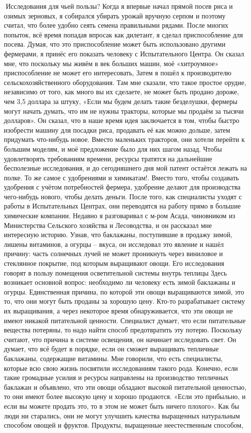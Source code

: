 \documentclass[a4paper]{book}
\begin{document}
Исследования для чьей пользы?
Когда я впервые начал прямой посев риса и озимых зерновых, я собирался убирать
урожай вручную серпом и поэтому считал, что более удобно сеять семена правильными
рядами. После многих попыток, всё время попадая впросак как дилетант, я сделал
приспособление для посева. Думая, что это приспособление может быть использовано
другими фермерами, я принёс его показать человеку с Испытательного Центра. Он сказал
мне, что поскольку мы живём в век больших машин, моё «хитроумное» приспособление не
может его интересовать,
Затем я пошёл к производителю сельскохозяйственного оборудования. Там мне сказали,
что такое простое орудие, независимо от того, как много вы их сделаете, не может быть
продано дороже, чем 3,5 доллара за штуку, «Если мы будем делать такие безделушки,
фермеры могут начать думать, что им не нужны тракторы, которые мы продаём за тысячи
долларов». Он сказал, что в наше время идея заключается в том, чтобы быстро изобрести
машину для посадки риса, продавать её как можно дольше, затем придумать что-нибудь
новое. Вместо маленьких тракторов, они хотели перейти к большим моделям, и моё
предложение было для них шагом назад. Чтобы удовлетворять требованиям времени,
ресурсы тратятся на дальнейшие бесполезные исследования, и до сегодняшнего дня мой
патент остаётся лежать на полке.
То же самое с удобрениями и химикатам!. Вместо того, чтобы создавать удобрения с
учётом потребностей фермера, удобрение делают для производства чего-нибудь нового,
чтобы делать деньги. После того, как специалисты уходят с работы в Испытательных
Центрах, они переводятся на работу прямо в большие химические компании. Недавно я
разговаривал с м-ром Асада, чиновником из Министерства Сельского хозяйства и
Лесоводства, и он рассказал мне интересную историю. Узнав, что баклажаны, поступившие
в продажу зимой, лишены витаминов, а огурцы – вкуса, он исследовал это явление и нашёл
причину: часть солнечных лучей не может проникнуть через виниловое и стеклянное
покрытие, под которым выращивают овощи. Его исследования говорят в пользу помещения
осветительной системы внутрь теплицы
Здесь возникает основной вопрос: необходимо ли человеку есть зимой баклажаны и
огурцы. Единственная причина, по которой эти овощи выращиваются зимой, это то, что они
могут быть проданы за хорошую цену. Кто-то разрабатывает систему их выращивания, а через
некоторое время обнаруживается, что эти овощи не имеют никакой питательной ценности.
Специалист думает, что если питательные вещества потеряны, то надо найти способ
предотвратить эту потерю. Поскольку считают, что причина в системе освещения, он
начинает исследовать свет. Он думает, что всё будет в порядке, если он сможет выращивать
тепличные баклажаны, содержащие витамины. Мне говорили, что есть специалисты,
которые всю свою жизнь посвятили исследованиям такого рода.
Конечно, если такие громадные усилия и ресурсы направлены на производство
тепличных баклажан и объявлено, что эти овощи обладают высокой питательной ценностью,
то они имеют более высокую цену и хорошо продаются. «Если это прибыльно, и если вы
можете продать это, то в этом не может быть ничего плохого».
Как бы люди ни старались, они не могут улучшить качества выращенных натуральным
способом овощей и фруктов. Продукты, выращенные неестественным способом,
\end{document}
